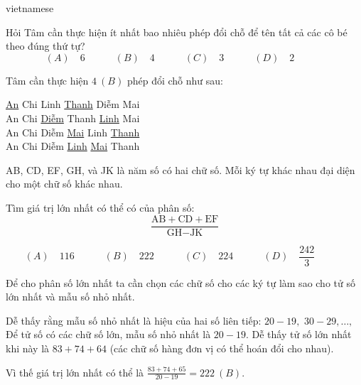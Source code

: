 \documentclass{article}
\begin{document}
\begin{otherlanguage*}{vietnamese}
\begin{problem*}[PI-2024-C-P19]
    Hỏi Tâm cần thực hiện ít nhất bao nhiêu phép đổi chỗ để tên tất cả các cô bé theo đúng thứ tự?
    \[
        (A) \quad 6 \qquad \quad
        (B) \quad 4 \qquad \quad
        (C) \quad 3 \qquad \quad
        (D) \quad 2 \qquad \quad
    \]
\end{problem*}

\begin{soln}
    Tâm cần thực hiện $\boxed{4\ (B)}$ phép đổi chỗ như sau:
    \begin{center}
        \underline{An} \quad Chi \quad Linh \quad \underline{Thanh} \quad Diễm \quad Mai\\
        An \quad Chi \quad \underline{Diễm} \quad Thanh \quad \underline{Linh} \quad Mai\\
        An \quad Chi \quad Diễm \quad \underline{Mai} \quad Linh \quad \underline{Thanh}\\
        An \quad Chi \quad Diễm \quad \underline{Linh} \quad \underline{Mai} \quad Thanh\\
    \end{center}
\end{soln}

\bigbreak

\begin{problem*}[PI-2024-C-P20]
    \label{problem:pi-2024-c-p20}

    AB, CD, EF, GH, và JK là năm số có hai chữ số.
    Mỗi ký tự khác nhau đại diện cho một chữ số khác nhau.

    Tìm giá trị lớn nhất có thể có của phân số:
    \[
        \frac{\text{AB} + \text{CD} + \text{EF}}{\text{GH}-\text{JK}}
    \]
    
    \[
        (A) \quad 116 \qquad \quad
        (B) \quad 222 \qquad \quad
        (C) \quad 224 \qquad \quad
        (D) \quad \frac{242}{3} \qquad \quad
    \]
\end{problem*}

\begin{soln}
    Để cho phân số lớn nhất ta cần chọn các chữ số cho các ký tự làm sao cho tử số lớn nhất và mẫu số nhỏ nhất.
    
    Dễ thấy rằng mẫu số nhỏ nhất là hiệu của hai số liên tiếp: $20-19,$ $30-29, \ldots,$
    Để tử số có các chữ số lớn, mẫu số nhỏ nhất là $20-19.$
    Dễ thấy tử số lớn nhất khi này là $83+74+64$ (các chữ số hàng đơn vị có thể hoán đổi cho nhau).

    Vì thế giá trị lớn nhất có thể là $\frac{83+74+65}{20-19}=\boxed{222\ (B).}$
\end{soln}


\end{otherlanguage*}
\end{document}
